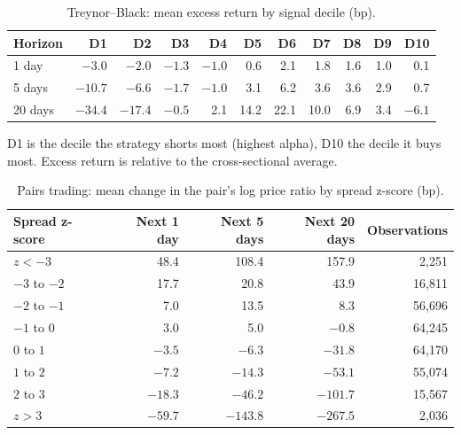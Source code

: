 \documentclass[11pt,letterpaper]{article}
\begin{document}
\begin{table}[!htbp]
    \centering
    \caption{Treynor--Black: mean excess return by signal decile (bp).}
    \label{tab:calibration-tb}
    \begin{tabular}{L{0.1}R{0.09}R{0.09}R{0.09}R{0.09}R{0.09}R{0.09}R{0.09}R{0.09}R{0.09}R{0.09}}
        \toprule
        Horizon & D1 & D2 & D3 & D4 & D5 & D6 & D7 & D8 & D9 & D10 \\
         day & $-3.0$ & $-2.0$ & $-1.3$ & $-1.0$ & 0.6 & 2.1 & 1.8 & 1.6 & 1.0 & 0.1 \\
        5 days & $-10.7$ & $-6.6$ & $-1.7$ & $-1.0$ & 3.1 & 6.2 & 3.6 & 3.6 & 2.9 & 0.7 \\
        20 days & $-34.4$ & $-17.4$ & $-0.5$ & 2.1 & 14.2 & 22.1 & 10.0 & 6.9 & 3.4 & $-6.1$ \\
        \bottomrule
    \end{tabular}
    \par\smallskip\noindent
    D1 is the decile the strategy shorts most (highest alpha), D10 the decile it buys most.
    Excess return is relative to the cross-sectional average.
\end{table}

\begin{table}[!htbp]
    \centering
    \caption{Pairs trading: mean change in the pair's log price ratio by spread z-score (bp).}
    \label{tab:calibration-pairs}
    \begin{tabular}{L{0.24}R{0.19}R{0.19}R{0.19}R{0.19}}
        \toprule
        Spread z-score & Next 1 day & Next 5 days & Next 20 days & Observations \\
        \midrule
        $z < -3$ & 48.4 & 108.4 & 157.9 & 2,251 \\
        $-3$ to $-2$ & 17.7 & 20.8 & 43.9 & 16,811 \\
        $-2$ to $-1$ & 7.0 & 13.5 & 8.3 & 56,696 \\
        $-1$ to $0$ & 3.0 & 5.0 & $-0.8$ & 64,245 \\
        $0$ to $1$ & $-3.5$ & $-6.3$ & $-31.8$ & 64,170 \\
        $1$ to $2$ & $-7.2$ & $-14.3$ & $-53.1$ & 55,074 \\
        $2$ to $3$ & $-18.3$ & $-46.2$ & $-101.7$ & 15,567 \\
        $z > 3$ & $-59.7$ & $-143.8$ & $-267.5$ & 2,036 \\
        \bottomrule
    \end{tabular}
\end{table}
\end{document}
